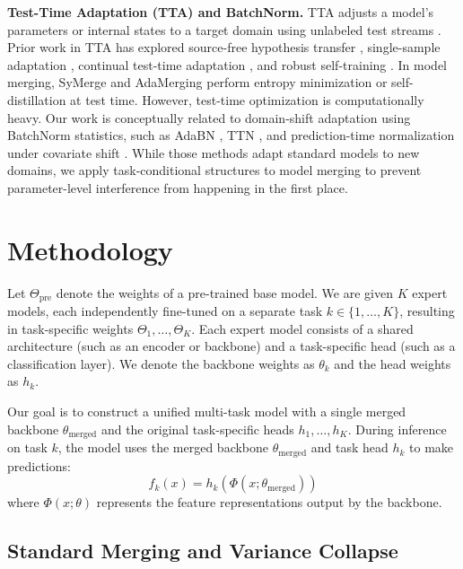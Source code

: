 \documentclass{article}
\theoremstyle{plain}
\theoremstyle{definition}
\theoremstyle{remark}
\begin{document}
\textbf{Test-Time Adaptation (TTA) and BatchNorm.} TTA adjusts a model's parameters or internal states to a target domain using unlabeled test streams \cite{wang2020tent, li2016adabn}. Prior work in TTA has explored source-free hypothesis transfer \cite{liang2020source}, single-sample adaptation \cite{zhang2022memo}, continual test-time adaptation \cite{wang2022continual}, and robust self-training \cite{niu2023towards, niu2022efficient, yuan2023robust}. In model merging, SyMerge \cite{jung2025symerge} and AdaMerging \cite{yang2024adamerging} perform entropy minimization or self-distillation at test time. However, test-time optimization is computationally heavy. Our work is conceptually related to domain-shift adaptation using BatchNorm statistics, such as AdaBN \cite{li2016adabn}, TTN \cite{song2023ttn}, and prediction-time normalization under covariate shift \cite{nado2020evaluating, schneider2020improving}. While those methods adapt standard models to new domains, we apply task-conditional structures to model merging to prevent parameter-level interference from happening in the first place.

\section{Methodology}
\label{method}

Let $\Theta_{\text{pre}}$ denote the weights of a pre-trained base model. We are given $K$ expert models, each independently fine-tuned on a separate task $k \in \{1, \dots, K\}$, resulting in task-specific weights $\Theta_1, \dots, \Theta_K$. Each expert model consists of a shared architecture (such as an encoder or backbone) and a task-specific head (such as a classification layer). We denote the backbone weights as $\theta_k$ and the head weights as $h_k$.

Our goal is to construct a unified multi-task model with a single merged backbone $\theta_{\text{merged}}$ and the original task-specific heads $h_1, \dots, h_K$. During inference on task $k$, the model uses the merged backbone $\theta_{\text{merged}}$ and task head $h_k$ to make predictions:
\begin{equation}
  f_k(x) = h_k(\Phi(x; \theta_{\text{merged}}))
\end{equation}
where $\Phi(x; \theta)$ represents the feature representations output by the backbone.

\subsection{Standard Merging and Variance Collapse}
\end{document}
